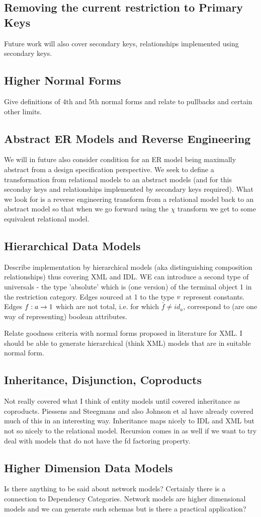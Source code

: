 \subsection{Removing the current restriction to Primary Keys}
Future work will also cover secondary keys, relationships implemented using secondary keys.

\subsection{Higher Normal Forms}
Give definitions of 4th and 5th normal forms and relate to pullbacks and certain other limits.  

\subsection {Abstract ER Models and Reverse Engineering}
We will in future also consider condition for an ER model being maximally abstract from a design specification perspective. We seek to define a transformation from relational models to an abstract models (and for this seconday keys and relationships implemented by secondary keys required). What we look for is a reverse engineering transform from a relational model back to an abstract model so that when we go forward using the $\chi$ transform we get to some equivalent relational model.

\subsection{Hierarchical Data Models}
Describe implementation by hierarchical models (aka distinguishing composition relationships) thus covering XML and IDL.
WE can introduce a second type of universals - the type 'absolute' which is (one version) of the terminal object 1 in the restriction
category. Edges sourced at 1 to the type $v$ represent constants. Edges $f: a \rightarrow 1$ which are not total, i.e. for which
$\bar{f} \neq id_a$, correspond to (are one way of representing) boolean attributes.  

Relate goodness criteria with  normal forms proposed in literature for XML. I should be able to generate hierarchical
(think XML) models that are in suitable normal form.

\subsection{Inheritance, Disjunction, Coproducts}
Not really covered what I think of entity models until covered inheritance as coproducts.
Piessens and Steegmans and also Johnson et al have already covered much of this in an interesting way. 
Inheritance maps nicely to IDL and XML but not so nicely to the relational model.  Recursion comes in as well if we want to try deal with models that do not have the fd factoring property.

\subsection{Higher Dimension Data Models}
Is there anything to be said about network models? Certainly there is a connection to Dependency Categories.
Network models are higher dimensional models and we can generate such schemas but is there a practical application?  
 
